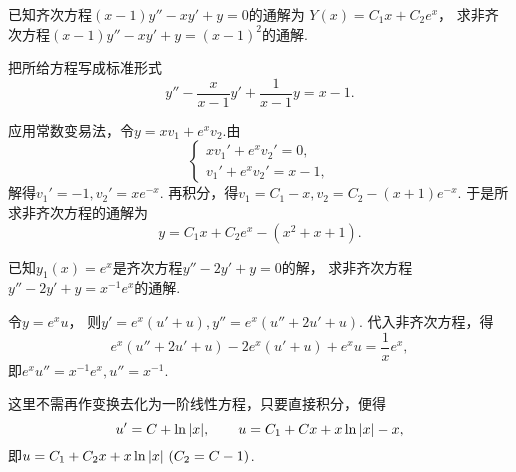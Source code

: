 \begin{example}
已知齐次方程\((x-1)y'' - xy' + y = 0\)的通解为
\(Y(x) = C_1 x + C_2 e^x\)，
求非齐次方程\((x-1)y'' - xy' + y = (x-1)^2\)的通解.
\begin{solution}
把所给方程写成标准形式\begin{equation*}
	y'' - \frac{x}{x-1} y' + \frac{1}{x-1} y = x-1.
\end{equation*}

应用常数变易法，令\(y = x v_1 + e^x v_2\).由\begin{equation*}
	\left\{ \begin{array}{l}
		x v_1' + e^x v_2' = 0, \\
		v_1' + e^x v_2' = x-1,
	\end{array} \right.
\end{equation*}
解得\(v_1' = -1, v_2' = x e^{-x}\).
再积分，得\(v_1 = C_1 - x, v_2 = C_2 - (x+1) e^{-x}\).
于是所求非齐次方程的通解为\begin{equation*}
	y = C_1 x + C_2 e^x - (x^2+x+1).
\end{equation*}
\end{solution}
\end{example}

\begin{example}
已知\(y_1(x) = e^x\)是齐次方程\(y'' - 2y' + y = 0\)的解，
求非齐次方程\(y'' - 2y' + y = x^{-1} e^x\)的通解.
\begin{solution}
令\(y = e^x u\)，
则\(y' = e^x (u'+u), y'' = e^x (u''+2u'+u)\).
代入非齐次方程，得\begin{equation*}
	e^x (u''+2u'+u) - 2e^x (u'+u) + e^x u = \frac{1}{x} e^x,
\end{equation*}
即\(e^x u'' = x^{-1} e^x, u'' = x^{-1}\).

这里不需再作变换去化为一阶线性方程，只要直接积分，便得\begin{equation*}
	u' = C + \ln\abs{x},
	\qquad
	u = C_1 + C x + x\ln\abs{x} - x,
\end{equation*}
即\(u = C_1 + C_2 x + x \ln\abs{x}\ (C_2=C-1)\).
\end{solution}
\end{example}

